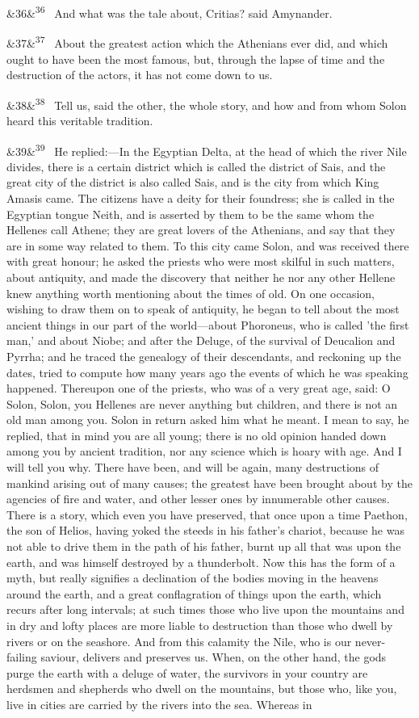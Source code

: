 \documentclass[12pt]{article}
\newcommand{\para}[1][]{\par\noindent\ifx&#1&\else\textsuperscript{\footnotesize #1}~\fi}
\begin{document}
\para[36] And what was the tale about, Critias? said Amynander.

\para[37] About the greatest action which the Athenians ever did, and which ought to have been the most famous, but, through the lapse of time and the destruction of the actors, it has not come down to us.

\para[38] Tell us, said the other, the whole story, and how and from whom Solon heard this veritable tradition.

\para[39] He replied:---In the Egyptian Delta, at the head of which the river Nile divides, there is a certain district which is called the district of Sais, and the great city of the district is also called Sais, and is the city from which King Amasis came. The citizens have a deity for their foundress; she is called in the Egyptian tongue Neith, and is asserted by them to be the same whom the Hellenes call Athene; they are great lovers of the Athenians, and say that they are in some way related to them. To this city came Solon, and was received there with great honour; he asked the priests who were most skilful in such matters, about antiquity, and made the discovery that neither he nor any other Hellene knew anything worth mentioning about the times of old. On one occasion, wishing to draw them on to speak of antiquity, he began to tell about the most ancient things in our part of the world---about Phoroneus, who is called 'the first man,' and about Niobe; and after the Deluge, of the survival of Deucalion and Pyrrha; and he traced the genealogy of their descendants, and reckoning up the dates, tried to compute how many years ago the events of which he was speaking happened. Thereupon one of the priests, who was of a very great age, said: O Solon, Solon, you Hellenes are never anything but children, and there is not an old man among you. Solon in return asked him what he meant. I mean to say, he replied, that in mind you are all young; there is no old opinion handed down among you by ancient tradition, nor any science which is hoary with age. And I will tell you why. There have been, and will be again, many destructions of mankind arising out of many causes; the greatest have been brought about by the agencies of fire and water, and other lesser ones by innumerable other causes. There is a story, which even you have preserved, that once upon a time Paethon, the son of Helios, having yoked the steeds in his father's chariot, because he was not able to drive them in the path of his father, burnt up all that was upon the earth, and was himself destroyed by a thunderbolt. Now this has the form of a myth, but really signifies a declination of the bodies moving in the heavens around the earth, and a great conflagration of things upon the earth, which recurs after long intervals; at such times those who live upon the mountains and in dry and lofty places are more liable to destruction than those who dwell by rivers or on the seashore. And from this calamity the Nile, who is our never-failing saviour, delivers and preserves us. When, on the other hand, the gods purge the earth with a deluge of water, the survivors in your country are herdsmen and shepherds who dwell on the mountains, but those who, like you, live in cities are carried by the rivers into the sea. Whereas in 
\end{document}
